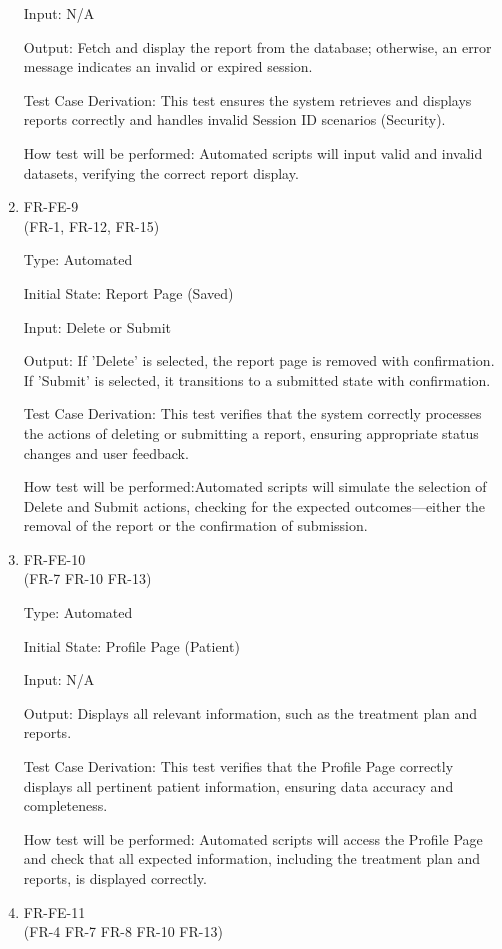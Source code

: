 \documentclass[12pt, titlepage]{article}
\begin{document}
\begin{enumerate}
Input: N/A
					
Output: Fetch and display the report from the database; otherwise, an error message indicates an invalid or expired session.

Test Case Derivation: This test ensures the system retrieves and displays reports correctly and handles invalid Session ID scenarios (Security).

How test will be performed: Automated scripts will input valid and invalid datasets, verifying the correct report display.

\item{FR-FE-9\\} (FR-1, FR-12, FR-15)

Type: Automated
					
Initial State: Report Page (Saved)
					
Input: Delete or Submit
					
Output: If 'Delete' is selected, the report page is removed with confirmation. If 'Submit' is selected, it transitions to a submitted state with confirmation.

Test Case Derivation: This test verifies that the system correctly processes the actions of deleting or submitting a report, ensuring appropriate status changes and user feedback.

How test will be performed:Automated scripts will simulate the selection of Delete and Submit actions, checking for the expected outcomes—either the removal of the report or the confirmation of submission.

\item{FR-FE-10\\} (FR-7 FR-10 FR-13)

Type: Automated
					
Initial State: Profile Page (Patient)
					
Input: N/A
					
Output: Displays all relevant information, such as the treatment plan and reports.

Test Case Derivation: This test verifies that the Profile Page correctly displays all pertinent patient information, ensuring data accuracy and completeness.

How test will be performed: Automated scripts will access the Profile Page and check that all expected information, including the treatment plan and reports, is displayed correctly.

\item{FR-FE-11\\} (FR-4 FR-7 FR-8 FR-10 FR-13)


\end{enumerate}
\end{document}
